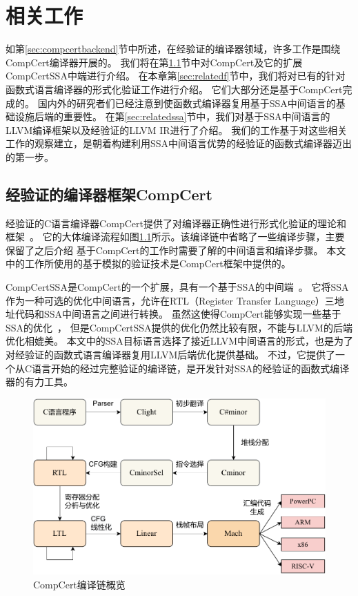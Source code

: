 
\chapter{相关工作} \label{ch:related}

如第\ref{sec:compcertbackend}节中所述，在经验证的编译器领域，许多工作是围绕CompCert编译器开展的。
我们将在第\ref{sec:relatedc}节中对CompCert及它的扩展CompCertSSA中端进行介绍。
在本章第\ref{sec:relatedf}节中，我们将对已有的针对函数式语言编译器的形式化验证工作进行介绍。
它们大部分还是基于CompCert完成的。 
国内外的研究者们已经注意到使函数式编译器复用基于SSA中间语言的基础设施后端的重要性。
在第\ref{sec:relatedssa}节中，我们对基于SSA中间语言的LLVM编译框架以及经验证的LLVM IR进行了介绍。
我们的工作基于对这些相关工作的观察建立，是朝着构建利用SSA中间语言优势的经验证的函数式编译器迈出的第一步。

\section{经验证的编译器框架CompCert} \label{sec:relatedc}

经验证的C语言编译器CompCert提供了对编译器正确性进行形式化验证的理论和框架~\cite{leroy2009formally}。
它的大体编译流程如图\ref{fig:compcert}所示。该编译链中省略了一些编译步骤，主要保留了之后介绍
基于CompCert的工作时需要了解的中间语言和编译步骤。
本文中的工作所使用的基于模拟的验证技术是CompCert框架中提供的。

CompCertSSA是CompCert的一个扩展，具有一个基于SSA的中间端~\cite{compcertssa}。
它将SSA作为一种可选的优化中间语言，允许在RTL（Register Transfer Language）三地址代码和SSA中间语言之间进行转换。
虽然这使得CompCert能够实现一些基于SSA的优化~\cite{compcertssa-op,blazy-cpp2023}，
但是CompCertSSA提供的优化仍然比较有限，不能与LLVM的后端优化相媲美。
本文中的SSA目标语言选择了接近LLVM中间语言的形式，也是为了对经验证的函数式语言编译器复用LLVM后端优化提供基础。
不过，它提供了一个从C语言开始的经过完整验证的编译链，是开发针对SSA的经验证的函数式编译器的有力工具。

\begin{figure}[htbp]
    \centering
    \includegraphics[width=0.8\linewidth]{figures/compcert.pdf}
    \caption{CompCert编译链概览}\label{fig:compcert}
\end{figure}



